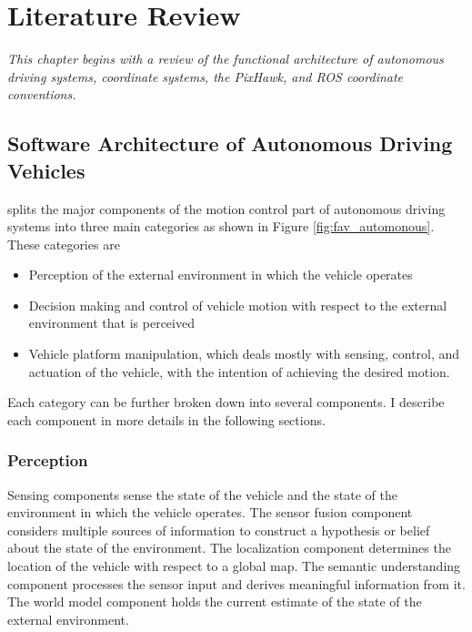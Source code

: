 \setlength{\footskip}{8mm}

\chapter{Literature Review} 
\label{ch:literature-review}

\textit{This chapter begins with a review of the functional architecture of autonomous driving systems, coordinate systems, the PixHawk, and ROS coordinate conventions.} 

\section{Software Architecture of Autonomous Driving Vehicles}
\label{section-name-in-literature-review}

 splits the major components of the motion control part of autonomous driving systems into three main categories as shown in Figure \ref{fig:fav_automonous}. These categories are

\begin{itemize}
	\item Perception of the external environment in which the vehicle operates
	\item Decision making and control of vehicle motion with respect to the external environment that is perceived
	\item Vehicle platform manipulation, which deals mostly with sensing, control, and actuation of the vehicle, with the intention of achieving the desired motion.
\end {itemize}

Each category can be further broken down into several components. I describe each component in more details in the following sections.

\subsection{Perception}

Sensing components sense the state of the vehicle and the state of the environment in which the vehicle operates. The sensor fusion component considers multiple sources of information to construct a hypothesis or belief about the state of the environment. The localization component determines the location of the vehicle with respect to a global map. The semantic understanding component processes the sensor input and derives meaningful information from it. The world model component holds the current estimate of the state of the external environment.

